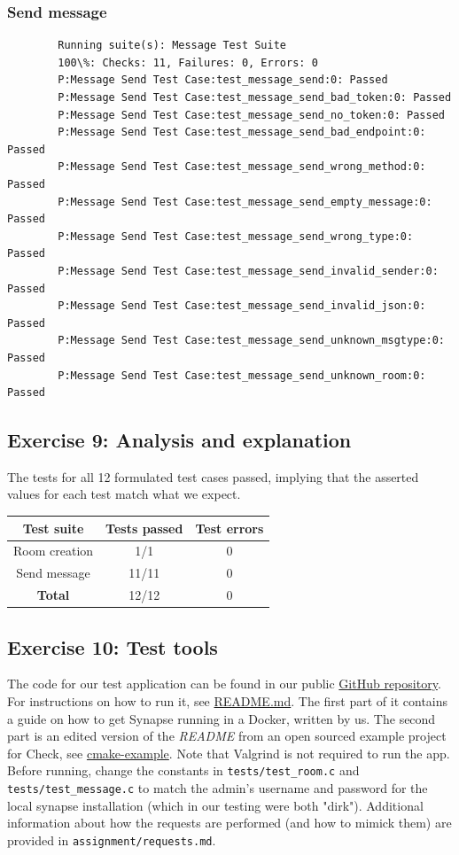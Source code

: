\documentclass[a4paper]{article}
\begin{document}
	\subsubsection{Send message} \label{send-message}
	\begin{verbatim}
		Running suite(s): Message Test Suite
		100\%: Checks: 11, Failures: 0, Errors: 0
		P:Message Send Test Case:test_message_send:0: Passed
		P:Message Send Test Case:test_message_send_bad_token:0: Passed
		P:Message Send Test Case:test_message_send_no_token:0: Passed
		P:Message Send Test Case:test_message_send_bad_endpoint:0: Passed
		P:Message Send Test Case:test_message_send_wrong_method:0: Passed
		P:Message Send Test Case:test_message_send_empty_message:0: Passed
		P:Message Send Test Case:test_message_send_wrong_type:0: Passed
		P:Message Send Test Case:test_message_send_invalid_sender:0: Passed
		P:Message Send Test Case:test_message_send_invalid_json:0: Passed
		P:Message Send Test Case:test_message_send_unknown_msgtype:0: Passed
		P:Message Send Test Case:test_message_send_unknown_room:0: Passed
	\end{verbatim}
	\subsection{Exercise 9: Analysis and explanation} \label{exercise-9-analysis-and-explanation}
	The tests for all 12 formulated test cases passed, implying that the asserted values for each test match what we expect.
	
	\begin{table}[h]
		\center
		\small
		\begin{tabular}{|c|c|c|}
			\hline
			\textbf{Test suite} & \textbf{Tests passed} & \textbf{Test errors} \\
			\hline
			Room creation & 1/1 & 0 \\
			\hline
			Send message & 11/11 & 0 \\
			\hline
			\textbf{Total} & 12/12 & 0 \\
			\hline
		\end{tabular}
	\end{table}
	\subsection{Exercise 10: Test tools} \label{exercise-10-test-tools}
	The code for our test application can be found in our public \href{https://github.com/kjvisscher/TestingTechniques1}{GitHub repository}. For instructions on how to run it, see \href{https://github.com/kjvisscher/TestingTechniques1/blob/main/README.md}{README.md}. The first part of it contains a guide on how to get Synapse running in a Docker, written by us. The second part is an edited version of the \textit{README} from an open sourced example project for Check, see \href{https://github.com/vndmtrx/check-cmake-example}{cmake-example}. Note that Valgrind is not required to run the app. Before running, change the constants in \texttt{tests/test\_room.c} and \texttt{tests/test\_message.c} to match the admin's username and password for the local synapse installation (which in our testing were both "dirk"). Additional information about how the requests are performed (and how to mimick them) are provided in \texttt{assignment/requests.md}.
\end{document}
